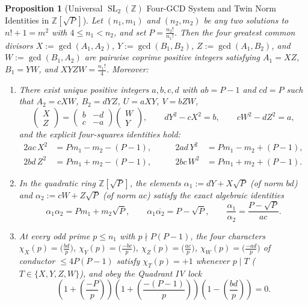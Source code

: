 \documentclass[11pt,reqno]{amsart}
\newtheorem{proposition}[theorem]{Proposition}
\theoremstyle{remark}
\numberwithin{equation}{section}
\newcommand{\Z}{\mathbb{Z}}
\DeclareMathOperator{\SL}{SL}
\begin{document}
\begin{proposition}[{Universal $\SL_2(\Z)$ Four-GCD System and Twin Norm Identities in $\Z[\sqrt{P}]$}]\label{prop:6.1}
Let $(n_1, m_1)$ and $(n_2, m_2)$ be any two solutions to $n! + 1 = m^2$ with $4 \le n_1 < n_2$, and set $P = \frac{n_2!}{n_1!}$. Then the four greatest common divisors $X := \gcd(A_1, A_2)$, $Y := \gcd(B_1, B_2)$, $Z := \gcd(A_1, B_2)$, and $W := \gcd(B_1, A_2)$ are pairwise coprime positive integers satisfying $A_1 = XZ$, $B_1 = YW$, and $XYZW = \frac{n_1!}{4}$. Moreover:
\begin{enumerate}
\item[(i)] There exist unique positive integers $a, b, c, d$ with $ab = P - 1$ and $cd = P$ such that $A_2 = cXW$, $B_2 = dYZ$, $U = aXY$, $V = bZW$,
\begin{equation}\label{eq:6.3}
\begin{pmatrix} X \\ Z \end{pmatrix} = \begin{pmatrix} b & -d \\ c & -a \end{pmatrix} \begin{pmatrix} W \\ Y \end{pmatrix}, \qquad dY^2 - cX^2 = b, \qquad cW^2 - dZ^2 = a,
\end{equation}
and the explicit four-squares identities hold:
\begin{equation}\label{eq:6.4}
\begin{aligned}
2ac\,X^2 &= Pm_1 - m_2 - (P - 1), \qquad & 2ad\,Y^2 &= Pm_1 - m_2 + (P - 1), \\
2bd\,Z^2 &= Pm_1 + m_2 - (P - 1), \qquad & 2bc\,W^2 &= Pm_1 + m_2 + (P - 1).
\end{aligned}
\end{equation}
\item[(ii)] In the quadratic ring $\Z[\sqrt{P}]$, the elements $\alpha_1 := dY + X\sqrt{P}$ (of norm $bd$) and $\alpha_2 := cW + Z\sqrt{P}$ (of norm $ac$) satisfy the exact algebraic identities
\begin{equation}\label{eq:6.5}
\alpha_1 \alpha_2 = Pm_1 + m_2\sqrt{P}, \qquad \alpha_1 \overline{\alpha_2} = P - \sqrt{P}, \qquad \frac{\alpha_1}{\alpha_2} = \frac{P - \sqrt{P}}{ac}.
\end{equation}
\item[(iii)] At every odd prime $p \le n_1$ with $p \nmid P(P - 1)$, the four characters $\chi_X(p) = \bigl(\frac{bd}{p}\bigr)$, $\chi_Y(p) = \bigl(\frac{-bc}{p}\bigr)$, $\chi_Z(p) = \bigl(\frac{ac}{p}\bigr)$, $\chi_W(p) = \bigl(\frac{-ad}{p}\bigr)$ of conductor $\le 4P(P - 1)$ satisfy $\chi_T(p) = +1$ whenever $p \mid T$ ($T \in \{X, Y, Z, W\}$), and obey the Quadrant IV lock
\begin{equation}\label{eq:6.6}
\left(1 + \left(\frac{-P}{p}\right)\right)\left(1 + \left(\frac{-(P - 1)}{p}\right)\right)\left(1 - \left(\frac{bd}{p}\right)\right) = 0.
\end{equation}
\end{enumerate}
\end{proposition}
\end{document}
